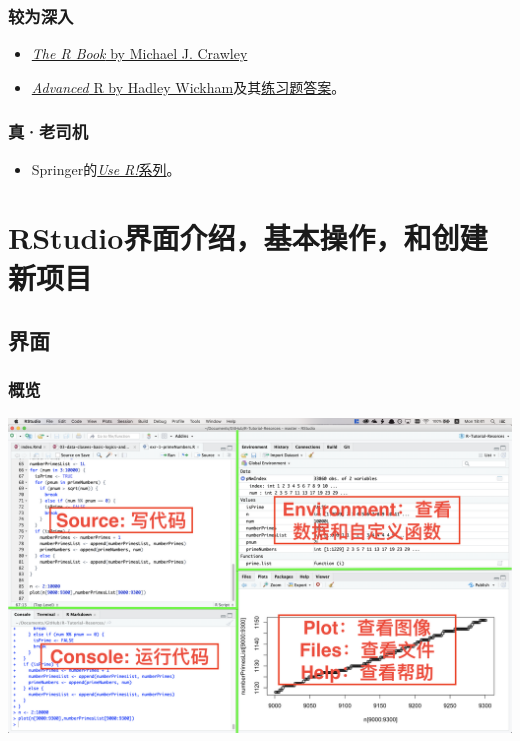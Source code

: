 \documentclass[]{book}
\providecommand{\tightlist}{%
  \setlength{\itemsep}{0pt}\setlength{\parskip}{0pt}}
\begin{document}
\subsubsection{较为深入}

\begin{itemize}
\tightlist
\item
  \href{https://github.com/TianyiShi2001/R-Tutorial-Resorces/blob/master/资源/书籍/TheRBook.pdf}{\emph{The R Book} by Michael J. Crawley}
\item
  \href{https://adv-r.hadley.nz/index.html}{\emph{Advanced} R by Hadley Wickham}及其\href{https://advanced-r-solutions.rbind.io}{练习题答案}。
\end{itemize}

\subsubsection{真·老司机}

\begin{itemize}
\tightlist
\item
  Springer的\href{https://www.springer.com/series/6991?detailsPage=titles}{\emph{Use R!}系列}。
\end{itemize}

\hypertarget{interface-basics-project}{%
\section{RStudio界面介绍，基本操作，和创建新项目}\label{interface-basics-project}}

\hypertarget{interface}{%
\subsection{界面}\label{interface}}

\hypertarget{interface-overview}{%
\subsubsection{概览}\label{interface-overview}}

\includegraphics[width=46.67in]{img/01-interface}
\end{document}
